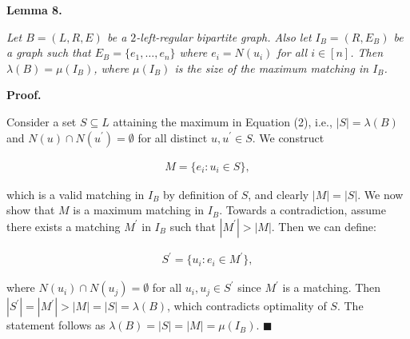 

\par\medskip\noindent\textbf{\textbf{Lemma 8}\textbf{.}}\par



\emph{Let $B=(L,R,E)$ be a $2$-left-regular bipartite graph.
Also let $I_{B}=(R,E_{B})$ be a graph such that $E_{B}=\{e_{1},\dots,e_{n}\}$ where $e_{i}=N(u_{i})$ for all $i\in[n]$.
Then $\lambda(B)=\mu(I_{B})$, where $\mu(I_{B})$ is the size of the maximum matching in $I_{B}$.}\par






\par\medskip\noindent\textbf{Proof.}\par



Consider a set $S\subseteq L$ attaining the maximum in Equation (2), i.e., $|S|=\lambda(B)$ and
$N(u)\cap N(u^{\prime})=\emptyset$ for all distinct $u,u^{\prime}\in S$.
We construct\par


\[\begin{gathered}
M=\{e_{i}:u_{i}\in S\},
\end{gathered}\]


which is a valid matching in $I_{B}$ by definition of $S$, and clearly $|M|=|S|$.
We now show that $M$ is a maximum matching in $I_{B}$.
Towards a contradiction, assume there exists a matching $M^{\prime}$ in $I_{B}$ such that $|M^{\prime}|>|M|$.
Then we can define:\par


\[\begin{gathered}
\displaystyle S^{\prime}=\{u_{i}:e_{i}\in M^{\prime}\},
\end{gathered}\]


where $N(u_{i})\cap N(u_{j})=\emptyset$ for all $u_{i},u_{j}\in S^{\prime}$ since $M^{\prime}$ is a matching.
Then $|S^{\prime}|=|M^{\prime}|>|M|=|S|=\lambda(B)$, which contradicts optimality of $S$.
The statement follows as $\lambda(B)=|S|=|M|=\mu(I_{B})$.
\ensuremath{\blacksquare}\par






